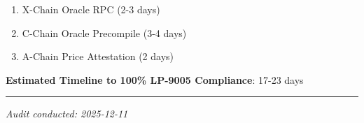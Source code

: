 \documentclass[
]{article}
\providecommand{\tightlist}{%
  \setlength{\itemsep}{0pt}\setlength{\parskip}{0pt}}
\begin{document}
\begin{enumerate}
\def\labelenumi{\arabic{enumi}.}
\tightlist
\item
  X-Chain Oracle RPC (2-3 days)
\item
  C-Chain Oracle Precompile (3-4 days)
\item
  A-Chain Price Attestation (2 days)
\end{enumerate}

\textbf{Estimated Timeline to 100\% LP-9005 Compliance}: 17-23 days

\begin{center}\rule{0.5\linewidth}{0.5pt}\end{center}

\emph{Audit conducted: 2025-12-11}
\end{document}
